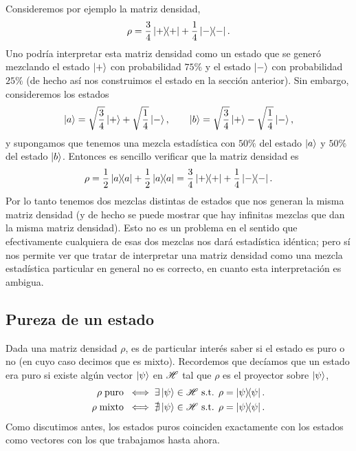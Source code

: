 \documentclass[10pt, a4paper]{article}
\numberwithin{equation}{subsection}
\begin{document}
Consideremos por ejemplo la matriz densidad,
\begin{equation}
  \rho = \frac{3}{4}\ketbra{+}{+} + \frac{1}{4}\ketbra{-}{-}.
\end{equation}
Uno podría interpretar esta matriz densidad como un estado que se generó
mezclando el estado $\ket{+}$ con probabilidad $75\%$ y el estado $\ket{-}$ con
probabilidad $25\%$ (de hecho así nos construimos el estado en la sección
anterior). Sin embargo, consideremos los estados
\begin{equation}
  \ket{a} = \sqrt{\frac{3}{4}}\ket{+} + \sqrt{\frac{1}{4}}\ket{-}, \qquad
  \ket{b} = \sqrt{\frac{3}{4}}\ket{+} - \sqrt{\frac{1}{4}}\ket{-},
\end{equation}
y supongamos que tenemos una mezcla estadística con $50\%$ del estado $\ket{a}$
y $50\%$ del estado $\ket{b}$. Entonces es sencillo verificar que la matriz
densidad es
\begin{equation}
  \rho
  = \frac{1}{2}\ketbra{a}{a} + \frac{1}{2}\ketbra{a}{a}
  = \frac{3}{4}\ketbra{+}{+} + \frac{1}{4}\ketbra{-}{-}.
\end{equation}
Por lo tanto tenemos dos mezclas distintas de estados que nos generan la misma
matriz densidad (y de hecho se puede mostrar que hay infinitas mezclas que dan
la misma matriz densidad). Esto no es un problema en el sentido que
efectivamente cualquiera de esas dos mezclas nos dará estadística idéntica;
pero sí nos permite ver que tratar de interpretar una matriz densidad como una
mezcla estadística particular en general no es correcto, en cuanto esta
interpretación es ambigua.

\subsection{Pureza de un estado}
Dada una matriz densidad $\rho$, es de particular interés saber si el estado es
puro o no (en cuyo caso decimos que es mixto). Recordemos que decíamos que un
estado era puro si existe algún vector $\ket{\psi}$ en $\mathscr{H}$ tal que
$\rho$ es el proyector sobre $\ket{\psi}$,
\begin{align}
  \rho \;\text{puro} \;\iff\; &\exists\ket{\psi}\in\Hilbert \text{ s.t. } \rho
    = \projector{\psi}. \\
  \rho \;\text{mixto} \;\iff\; &\nexists\ket{\psi}\in\Hilbert \text{ s.t. }
    \rho = \projector{\psi}.
\end{align}
Como discutimos antes, los estados puros coinciden exactamente con los estados
como vectores con los que trabajamos hasta ahora.
\end{document}
